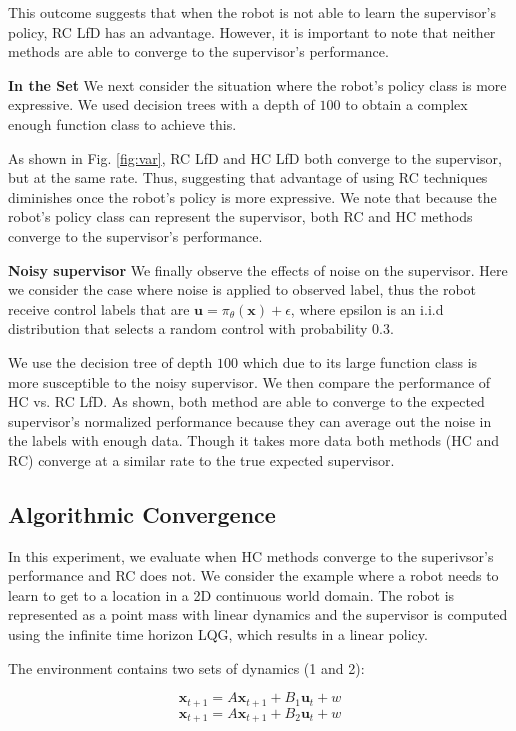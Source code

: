 \documentclass[10pt, conference]{ieeeconf}      %
\newcommand{\bu}{\mathbf{u}}
\newcommand{\bx}{\mathbf{x}}
\begin{document}
This outcome suggests that when the robot is not able to learn the supervisor's policy, RC LfD has an advantage. However, it is important to note that neither methods are able to converge to the supervisor's performance. 

\noindent \textbf{In the Set}
We next consider the situation where the robot's policy class is more expressive. We used decision trees with a depth of $100$ to obtain a complex enough function class to achieve this. 

As shown in Fig. \ref{fig:var}, RC LfD and HC LfD both converge to the supervisor, but at the same rate. Thus, suggesting that advantage of using RC techniques diminishes once the robot's policy is more expressive. We note that because the robot's policy class can represent the supervisor, both RC and HC methods converge to the supervisor's performance.


\noindent \textbf{Noisy supervisor}
We finally observe the effects of noise on the supervisor. Here we consider the case where noise is applied to observed label, thus the robot receive control labels that are $\bu = \pi_{\theta}(\bx) + \epsilon$,  where epsilon is an i.i.d distribution that selects a random control with probability $0.3$.

We use the  decision tree  of depth $100$ which due to its large function class is more susceptible to the noisy supervisor. We then compare the performance of HC vs. RC LfD. As shown, both method are able to converge to the expected supervisor's normalized performance because they can average out the noise in the labels with enough data. Though it  takes more data both methods (HC and RC) converge at a similar rate to the true expected supervisor. 




\subsection{Algorithmic Convergence }
In this experiment, we evaluate when HC methods converge to the superivsor's performance and RC does not. We consider the example where a robot needs to learn to get to a location in a 2D continuous world domain. The robot is represented as a point mass with linear dynamics and the supervisor is computed using the infinite time horizon LQG, which results in a linear policy. 

The environment contains two sets of dynamics (1 and 2): 

$$\bx_{t+1} = A\bx_{t+1}+B_1\bu_t+w$$
$$\bx_{t+1} = A\bx_{t+1}+B_2\bu_t + w$$
\end{document}
